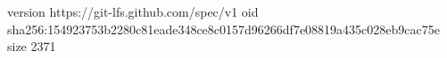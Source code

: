 version https://git-lfs.github.com/spec/v1
oid sha256:154923753b2280c81eade348ce8c0157d96266df7e08819a435c028eb9cac75e
size 2371
